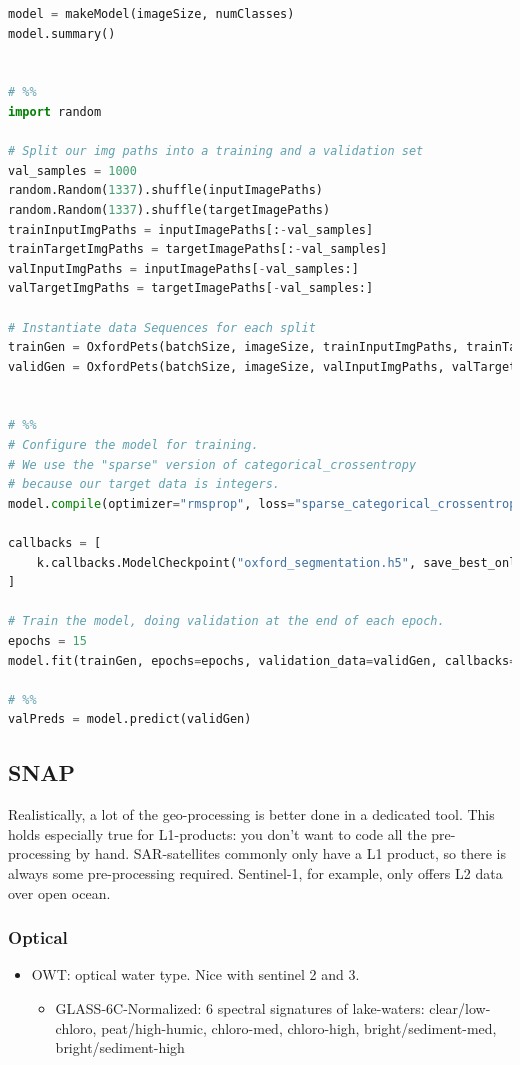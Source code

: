 \begin{lstlisting}[language=python]
model = makeModel(imageSize, numClasses)
model.summary()


# %%
import random

# Split our img paths into a training and a validation set
val_samples = 1000
random.Random(1337).shuffle(inputImagePaths)
random.Random(1337).shuffle(targetImagePaths)
trainInputImgPaths = inputImagePaths[:-val_samples]
trainTargetImgPaths = targetImagePaths[:-val_samples]
valInputImgPaths = inputImagePaths[-val_samples:]
valTargetImgPaths = targetImagePaths[-val_samples:]

# Instantiate data Sequences for each split
trainGen = OxfordPets(batchSize, imageSize, trainInputImgPaths, trainTargetImgPaths)
validGen = OxfordPets(batchSize, imageSize, valInputImgPaths, valTargetImgPaths)


# %%
# Configure the model for training.
# We use the "sparse" version of categorical_crossentropy
# because our target data is integers.
model.compile(optimizer="rmsprop", loss="sparse_categorical_crossentropy")

callbacks = [
    k.callbacks.ModelCheckpoint("oxford_segmentation.h5", save_best_only=True)
]

# Train the model, doing validation at the end of each epoch.
epochs = 15
model.fit(trainGen, epochs=epochs, validation_data=validGen, callbacks=callbacks)

# %%
valPreds = model.predict(validGen)

\end{lstlisting}



\subsection{SNAP}
Realistically, a lot of the geo-processing is better done in a dedicated tool.
This holds especially true for L1-products: you don't want to code all the pre-processing by hand.
SAR-satellites commonly only have a L1 product, so there is always some pre-processing required. 
Sentinel-1, for example, only offers L2 data over open ocean.


\subsubsection{Optical}

\begin{itemize}
    \item OWT: optical water type. Nice with sentinel 2 and 3. \begin{itemize}
        \item GLASS-6C-Normalized: 6 spectral signatures of lake-waters: clear/low-chloro, peat/high-humic, chloro-med, chloro-high, bright/sediment-med, bright/sediment-high
    \end{itemize}
\end{itemize}

